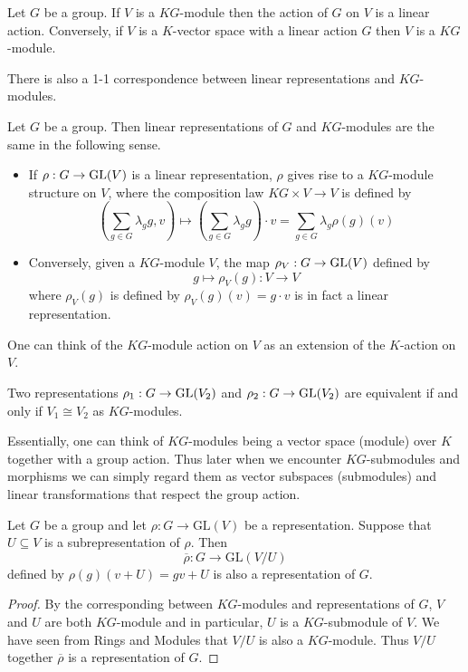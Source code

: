 \documentclass[a4paper]{article}
\begin{document}
\begin{prp}{}{} Let $G$ be a group. If $V$ is a $KG$-module then the action of $G$ on $V$ is a linear action. Conversely, if $V$ is a $K$-vector space with a linear action $G$ then $V$ is a $KG$-module. 
\end{prp}

There is also a 1-1 correspondence between linear representations and $KG$-modules. 

\begin{thm}{}{} Let $G$ be a group. Then linear representations of $G$ and $KG$-modules are the same in the following sense. 
\begin{itemize}
\item If $\rho:G\to\operatorname{GL}(V)$ is a linear representation, $\rho$ gives rise to a $KG$-module structure on $V$, where the composition law $KG\times V\to V$ is defined by $$\left(\sum_{g\in G}\lambda_gg,v\right)\mapsto\left(\sum_{g\in G}\lambda_gg\right)\cdot v=\sum_{g\in G}\lambda_g\rho(g)(v)$$
\item Conversely, given a $KG$-module $V$, the map $\rho_V:G\to\operatorname{GL}(V)$ defined by $$g\mapsto\rho_V(g):V\to V$$ where $\rho_V(g)$ is defined by $\rho_V(g)(v)=g\cdot v$ is in fact a linear representation. 
\end{itemize}
\end{thm}

One can think of the $KG$-module action on $V$ as an extension of the $K$-action on $V$. 

\begin{lmm}{}{} Two representations $\rho_1:G\to\operatorname{GL}(V_2)$ and $\rho_2:G\to\operatorname{GL}(V_2)$ are equivalent if and only if $V_1\cong V_2$ as $KG$-modules. 
\end{lmm}

Essentially, one can think of $KG$-modules being a vector space (module) over $K$ together with a group action. Thus later when we encounter $KG$-submodules and morphisms we can simply regard them as vector subspaces (submodules) and linear transformations that respect the group action. 

\begin{prp}{}{} Let $G$ be a group and let $\rho:G\to\text{GL}(V)$ be a representation. Suppose that $U\subseteq V$ is a subrepresentation of $\rho$. Then $$\overline{\rho}:G\to\text{GL}(V/U)$$ defined by $\rho(g)(v+U)=gv+U$ is also a representation of $G$. \tcbline
\begin{proof}
By the corresponding between $KG$-modules and representations of $G$, $V$ and $U$ are both $KG$-module and in particular, $U$ is a $KG$-submodule of $V$. We have seen from Rings and Modules that $V/U$ is also a $KG$-module. Thus $V/U$ together $\overline{\rho}$ is a representation of $G$. 
\end{proof}
\end{prp}
\end{document}
